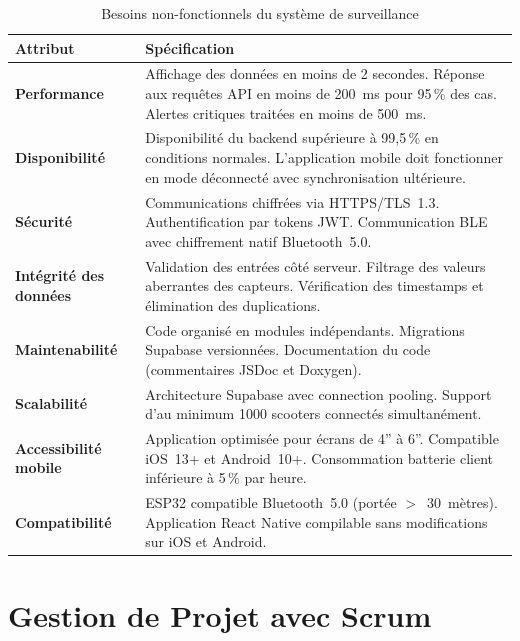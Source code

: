 \documentclass[12pt, a4paper]{report}
\begin{document}
\begin{table}[H]
  \centering
  \caption{Besoins non-fonctionnels du système de surveillance}
  \label{tab:nonfonctionne}
  \renewcommand{\arraystretch}{1.4}
  \small
  \begin{tabularx}{\textwidth}{|p{2.8cm}|X|}
    \hline
    \rowcolor{isimablue!20}
    \textbf{Attribut} & \textbf{Spécification} \\
    \hline
    \textbf{Performance} & Affichage des données en moins de 2 secondes. Réponse aux requêtes API en moins de 200~ms pour 95\,\% des cas. Alertes critiques traitées en moins de 500~ms. \\
    \hline
    \textbf{Disponibilité} & Disponibilité du backend supérieure à 99,5\,\% en conditions normales. L'application mobile doit fonctionner en mode déconnecté avec synchronisation ultérieure. \\
    \hline
    \textbf{Sécurité} & Communications chiffrées via HTTPS/TLS~1.3. Authentification par tokens JWT. Communication BLE avec chiffrement natif Bluetooth~5.0. \\
    \hline
    \textbf{Intégrité des données} & Validation des entrées côté serveur. Filtrage des valeurs aberrantes des capteurs. Vérification des timestamps et élimination des duplications. \\
    \hline
    \textbf{Maintenabilité} & Code organisé en modules indépendants. Migrations Supabase versionnées. Documentation du code (commentaires JSDoc et Doxygen). \\
    \hline
    \textbf{Scalabilité} & Architecture Supabase avec connection pooling. Support d'au minimum 1000 scooters connectés simultanément. \\
    \hline
    \textbf{Accessibilité mobile} & Application optimisée pour écrans de 4'' à 6''. Compatible iOS~13+ et Android~10+. Consommation batterie client inférieure à 5\,\% par heure. \\
    \hline
    \textbf{Compatibilité} & ESP32 compatible Bluetooth~5.0 (portée $>$~30~mètres). Application React Native compilable sans modifications sur iOS et Android. \\
    \hline
  \end{tabularx}
\end{table}

\section{Gestion de Projet avec Scrum}
\end{document}
